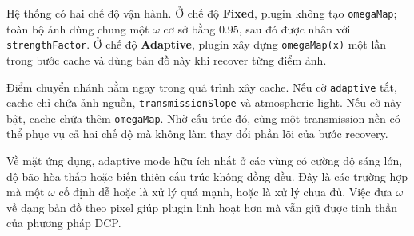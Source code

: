 Hệ thống có hai chế độ vận hành. Ở chế độ \textbf{Fixed}, plugin không tạo \texttt{omegaMap}; toàn bộ ảnh dùng chung một \(\omega\) cơ sở bằng \(0.95\), sau đó được nhân với \texttt{strengthFactor}. Ở chế độ \textbf{Adaptive}, plugin xây dựng \texttt{omegaMap(x)} một lần trong bước cache và dùng bản đồ này khi recover từng điểm ảnh.

Điểm chuyển nhánh nằm ngay trong quá trình xây cache. Nếu cờ \texttt{adaptive} tắt, cache chỉ chứa ảnh nguồn, \texttt{transmissionSlope} và atmospheric light. Nếu cờ này bật, cache chứa thêm \texttt{omegaMap}. Nhờ cấu trúc đó, cùng một transmission nền có thể phục vụ cả hai chế độ mà không làm thay đổi phần lõi của bước recovery.

Về mặt ứng dụng, adaptive mode hữu ích nhất ở các vùng có cường độ sáng lớn, độ bão hòa thấp hoặc biến thiên cấu trúc không đồng đều. Đây là các trường hợp mà một \(\omega\) cố định dễ hoặc là xử lý quá mạnh, hoặc là xử lý chưa đủ. Việc đưa \(\omega\) về dạng bản đồ theo pixel giúp plugin linh hoạt hơn mà vẫn giữ được tinh thần của phương pháp DCP.
